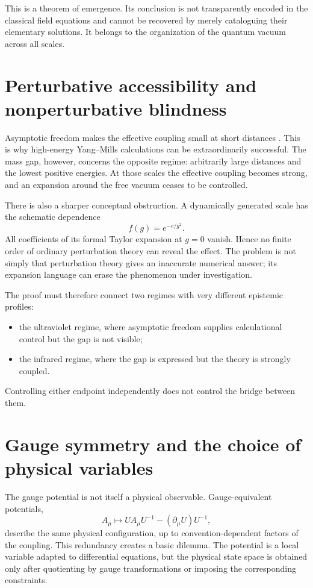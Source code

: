 \documentclass[11pt]{article}
\begin{document}
This is a theorem of emergence.  Its conclusion is not transparently encoded
in the classical field equations and cannot be recovered by merely cataloguing
their elementary solutions.  It belongs to the organization of the quantum
vacuum across all scales.

\section{Perturbative accessibility and nonperturbative blindness}

Asymptotic freedom makes the effective coupling small at short distances
\cite{gross-wilczek,politzer}.  This is why high-energy Yang--Mills calculations
can be extraordinarily successful.  The mass gap, however, concerns the
opposite regime: arbitrarily large distances and the lowest positive energies.
At those scales the effective coupling becomes strong, and an expansion around
the free vacuum ceases to be controlled.

There is also a sharper conceptual obstruction.  A dynamically generated scale
has the schematic dependence
\begin{equation}
  f(g)=e^{-c/g^{2}}.
\end{equation}
All coefficients of its formal Taylor expansion at $g=0$ vanish.  Hence no
finite order of ordinary perturbation theory can reveal the effect.  The
problem is not simply that perturbation theory gives an inaccurate numerical
answer; its expansion language can erase the phenomenon under investigation.

The proof must therefore connect two regimes with very different epistemic
profiles:
\begin{itemize}[leftmargin=2em]
  \item the ultraviolet regime, where asymptotic freedom supplies calculational
        control but the gap is not visible;
  \item the infrared regime, where the gap is expressed but the theory is
        strongly coupled.
\end{itemize}
Controlling either endpoint independently does not control the bridge between
them.

\section{Gauge symmetry and the choice of physical variables}

The gauge potential is not itself a physical observable.  Gauge-equivalent
potentials,
\begin{equation}
  A_{\mu}
  \longmapsto
  U A_{\mu}U^{-1}-(\partial_{\mu}U)U^{-1},
  \label{eq:gauge-transform}
\end{equation}
describe the same physical configuration, up to convention-dependent factors
of the coupling.  This redundancy creates a basic dilemma.  The potential is a
local variable adapted to differential equations, but the physical state space
is obtained only after quotienting by gauge transformations or imposing the
corresponding constraints.
\end{document}
